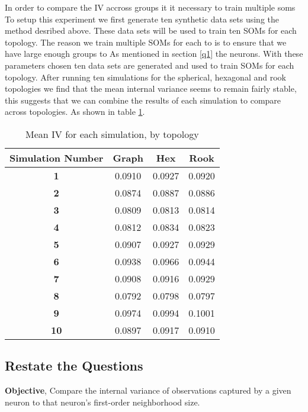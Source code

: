 In order to compare the IV accross groups it it necessary to train multiple
soms 
To setup this experiment we
first generate ten synthetic data sets using the method desribed above.  These
data sets will be used to train ten SOMs for each topology.  The reason we
train multiple SOMs for each to is to ensure that we have large enough groups to 
As mentioned in section \ref{q1} the neurons.
With these parameters chosen ten data sets are generated and used to train
SOMs for each topology.  After running ten simulations for the spherical,
hexagonal and rook topologies we find that the mean internal variance seems to
remain fairly stable, this suggests that we can combine the results of each
simulation to compare across topologies. As shown in table \ref{ivtable3}.

\begin{table}
\centering
\caption{Mean IV for each simulation, by topology}
\label{ivtable3}
\begin{tabular}{|c||c|c|c|}
\hline
\textbf{Simulation Number} & Graph & Hex & Rook \\
\hline
\hline
\textbf{1} & 0.0910 & 0.0927 & 0.0920 \\
\hline
\textbf{2} & 0.0874 & 0.0887 & 0.0886 \\
\hline
\textbf{3} & 0.0809 & 0.0813 & 0.0814 \\
\hline
\textbf{4} & 0.0812 & 0.0834 & 0.0823 \\
\hline
\textbf{5} & 0.0907 & 0.0927 & 0.0929 \\
\hline
\textbf{6} & 0.0938 & 0.0966 & 0.0944 \\
\hline
\textbf{7} & 0.0908 & 0.0916 & 0.0929 \\
\hline
\textbf{8} & 0.0792 & 0.0798 & 0.0797 \\
\hline
\textbf{9} & 0.0974 & 0.0994 & 0.1001 \\
\hline
\textbf{10} & 0.0897 & 0.0917 & 0.0910 \\
\hline
\end{tabular} \end{table}



\subsection{Restate the Questions}
\textbf{Objective}, Compare the internal variance of observations captured by a given
neuron to that neuron's first-order neighborhood size.


